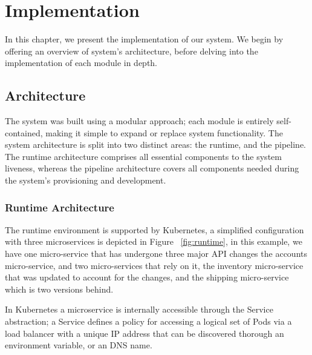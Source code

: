 
%

\chapter{Implementation}
\label{cha:implementation}

In this chapter, we present the implementation of our system.
We begin by offering an overview of system's architecture,
before delving into the implementation of each module in depth.

\section{Architecture} %
\label{sec:architecture}


The system was built using a modular approach;
each module is entirely self-contained, making it simple to expand or replace system functionality.
The system architecture is split into two distinct areas: the runtime, and the pipeline.
The runtime architecture comprises all essential components to the system liveness,
whereas the pipeline architecture covers all components needed during the system's provisioning and development.

\subsection{Runtime Architecture} %
\label{sec:runtime_architecture}

The runtime environment is supported by Kubernetes,
a simplified configuration with three microservices is depicted in Figure ~\ref{fig:runtime},
in this example, we have one micro-service that has undergone three major API changes the accounts micro-service, and
two micro-services that rely on it, the inventory micro-service that was updated to account for the changes, and the shipping micro-service which is two versions behind.

In Kubernetes a microservice is internally accessible through the Service abstraction;
a Service defines a policy for accessing a logical set of Pods via a load balancer with a
unique IP address that can be discovered thorough an environment variable, or an DNS name.

